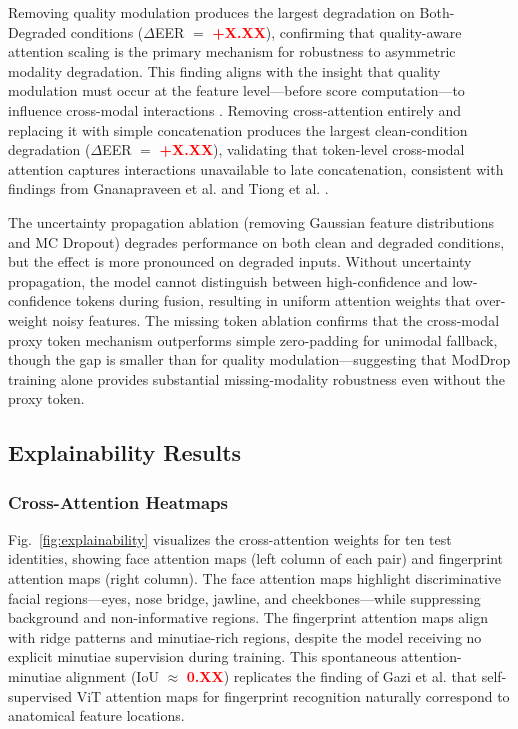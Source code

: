 \documentclass[10pt,journal,compsoc]{IEEEtran}
\begin{document}
Removing quality modulation produces the largest degradation on Both-Degraded conditions ($\Delta$EER $=$ \textcolor{red}{\textbf{+X.XX}}), %
confirming that quality-aware attention scaling is the primary mechanism for robustness to asymmetric modality degradation. This finding aligns with the insight that quality modulation must occur at the feature level---before score computation---to influence cross-modal interactions \cite{soleymani2021quality}. Removing cross-attention entirely and replacing it with simple concatenation produces the largest clean-condition degradation ($\Delta$EER $=$ \textcolor{red}{\textbf{+X.XX}}), %
validating that token-level cross-modal attention captures interactions unavailable to late concatenation, consistent with findings from Gnanapraveen et al. \cite{gnanapraveen2024odyssey} and Tiong et al. \cite{tiong2024flexible}.

The uncertainty propagation ablation (removing Gaussian feature distributions and MC Dropout) degrades performance on both clean and degraded conditions, but the effect is more pronounced on degraded inputs. Without uncertainty propagation, the model cannot distinguish between high-confidence and low-confidence tokens during fusion, resulting in uniform attention weights that over-weight noisy features. The missing token ablation confirms that the cross-modal proxy token mechanism \cite{reza2025cmpt} outperforms simple zero-padding for unimodal fallback, though the gap is smaller than for quality modulation---suggesting that ModDrop training alone provides substantial missing-modality robustness even without the proxy token.

\subsection{Explainability Results}
\label{subsec:explainability}

\subsubsection{Cross-Attention Heatmaps} Fig.~\ref{fig:explainability} visualizes the cross-attention weights for ten test identities, showing face attention maps (left column of each pair) and fingerprint attention maps (right column). The face attention maps highlight discriminative facial regions---eyes, nose bridge, jawline, and cheekbones---while suppressing background and non-informative regions. The fingerprint attention maps align with ridge patterns and minutiae-rich regions, despite the model receiving no explicit minutiae supervision during training. This spontaneous attention-minutiae alignment (IoU $\approx$ \textcolor{red}{\textbf{0.XX}}) %
replicates the finding of Gazi et al. \cite{gazi2026explainable} that self-supervised ViT attention maps for fingerprint recognition naturally correspond to anatomical feature locations.
\end{document}
